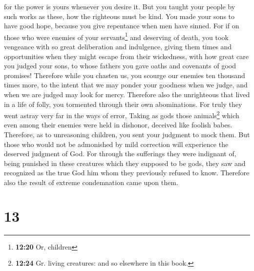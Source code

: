 for the power is yours whenever you desire it.  But you
taught your people by such works as these, how the righteous must be
kind. You made your sons to have good hope, because you give repentance
when men have sinned.  For if on those who were enemies
of your servants\footnote{\textbf{12:20} Or, children} and deserving of
death, you took vengeance with so great deliberation and indulgence,
giving them times and opportunities when they might escape from their
wickedness,  with how great care you judged your sons, to
whose fathers you gave oaths and covenants of good promises!
 Therefore while you chasten us, you scourge our enemies
ten thousand times more, to the intent that we may ponder your goodness
when we judge, and when we are judged may look for mercy.
 Therefore also the unrighteous that lived in a life of
folly, you tormented through their own abominations.  For
truly they went astray very far in the ways of error, Taking as gods
those animals\footnote{\textbf{12:24} Gr. living creatures: and so
  elsewhere in this book.} which even among their enemies were held in
dishonor, deceived like foolish babes.  Therefore, as to
unreasoning children, you sent your judgment to mock them.
 But those who would not be admonished by mild correction
will experience the deserved judgment of God.  For
through the sufferings they were indignant of, being punished in these
creatures which they supposed to be gods, they saw and recognized as the
true God him whom they previously refused to know. Therefore also the
result of extreme condemnation came upon them.

\hypertarget{section-12}{%
\section{13}\label{section-12}}

